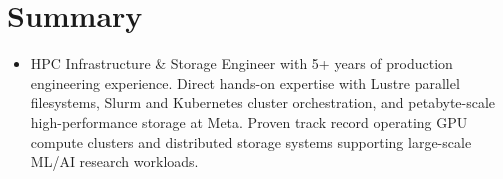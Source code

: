 \section{Summary}
\begin{itemize}[leftmargin=0.15in, label={}]
  \item{HPC Infrastructure \& Storage Engineer with 5+ years of production engineering experience. Direct hands-on expertise with Lustre parallel filesystems, Slurm and Kubernetes cluster orchestration, and petabyte-scale high-performance storage at Meta. Proven track record operating GPU compute clusters and distributed storage systems supporting large-scale ML/AI research workloads.}
\end{itemize}
